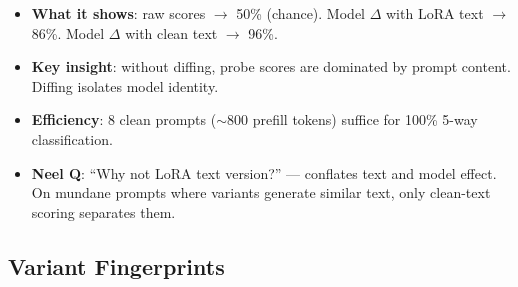 \documentclass[11pt]{article}
\begin{document}
\begin{itemize}
  \item \textbf{What it shows}: raw scores $\to$ 50\% (chance). Model $\Delta$ with LoRA text $\to$ 86\%. Model $\Delta$ with clean text $\to$ 96\%.
  \item \textbf{Key insight}: without diffing, probe scores are dominated by prompt content. Diffing isolates model identity.
  \item \textbf{Efficiency}: 8 clean prompts ($\sim$800 prefill tokens) suffice for 100\% 5-way classification.
  \item \textbf{Neel Q}: ``Why not LoRA text version?'' --- conflates text and model effect. On mundane prompts where variants generate similar text, only clean-text scoring separates them.
\end{itemize}

\subsection{Variant Fingerprints}

\end{document}
